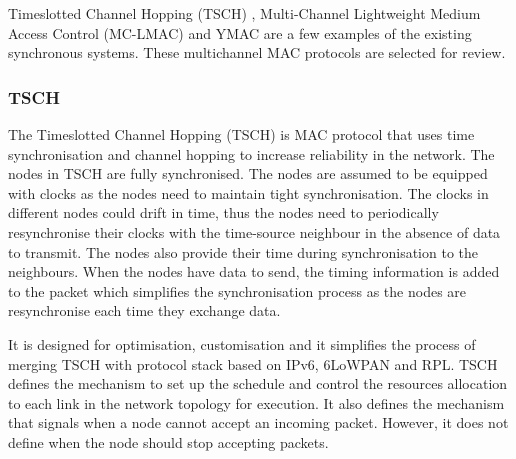 Timeslotted Channel Hopping (TSCH) \cite{tsch}, Multi-Channel Lightweight Medium Access Control (MC-LMAC) \cite{mc-lmac} and YMAC \cite{y-mac} are a few examples of the existing synchronous systems. These multichannel MAC protocols are selected for review. 






\subsubsection{TSCH}
The Timeslotted Channel Hopping (TSCH) \cite{tsch} is MAC protocol that uses time synchronisation and channel hopping to increase reliability in the network. The nodes in TSCH are fully synchronised. The nodes are assumed to be equipped with clocks as the nodes need to maintain tight synchronisation. The clocks in different nodes could drift in time, thus the nodes need to periodically resynchronise their clocks with the time-source neighbour in the absence of data to transmit. The nodes also provide their time during synchronisation to the neighbours. When the nodes have data to send, the timing information is added to the packet which simplifies the synchronisation process as the nodes are resynchronise each time they exchange data.

It is designed for optimisation, customisation and it simplifies the process of merging TSCH with protocol stack based on IPv6, 6LoWPAN and RPL. TSCH defines the mechanism to set up the schedule and control the resources allocation to each link in the network topology for execution. It also defines the mechanism that signals when a node cannot accept an incoming packet. However, it does not define when the node should stop accepting packets.

